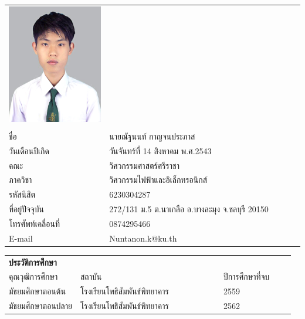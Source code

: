 \begin{center}
\begin{longtable}{@{}p{0.34\linewidth}@{}p{0.66\linewidth}@{}}
\includegraphics[scale=0.2,valign=c]{Chapters/img/nisit img/6230304287.jpg} & \\
    &\\
	ชื่อ							& นายณัฐนนท์ กาญจนประภาส\\
	วันเดือนปีเกิด						& วันจันทร์ที่ 14 สิงหาคม พ.ศ.2543\\
	คณะ							& วิศวกรรมศาสตร์ศรีราชา\\
	ภาควิชา							& วิศวกรรมไฟฟ้าและอิเล็กทรอนิกส์\\
	รหัสนิสิต						& 6230304287\\
	ที่อยู่ปัจจุบัน						& 272/131 ม.5 ต.นาเกลือ อ.บางละมุง จ.ชลบุรี 20150\\
	โทรศัพท์เคลื่อนที่					& 0874295466\\
	E-mail						& Nuntanon.k@ku.th\\
\end{longtable}

\begin{longtable}{@{}p{0.25\linewidth}@{}p{0.5\linewidth}@{}p{0.25\linewidth}}
	\textbf{ประวัติการศึกษา} & &\\
	คุณวุฒิการศึกษา		&	สถาบัน				&	ปีการศึกษาที่จบ \\\hline
	มัธยมศึกษาตอนต้น	&	โรงเรียนโพธิสัมพันธ์พิทยาคาร	&	2559 	\\
	มัธยมศึกษาตอนปลาย	&	โรงเรียนโพธิสัมพันธ์พิทยาคาร	&	2562 	\\
\end{longtable}
\end{center}